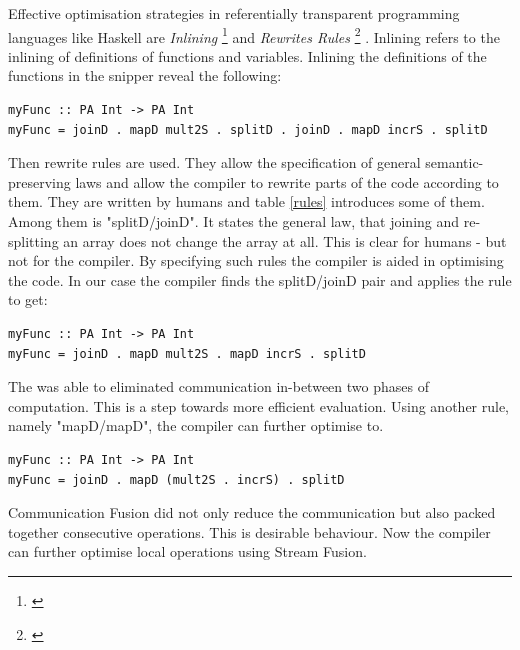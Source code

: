     Effective optimisation strategies in referentially transparent
    programming languages like Haskell are \emph{Inlining}
    \footnote{\cite{Inlining2002}}
    and \emph{Rewrites Rules}
    \footnote{\cite{Simon2001Rewrites}}
    .
    Inlining refers to the inlining of definitions
    of functions and variables. Inlining the definitions
    of the functions in the snipper reveal the following:
    \begin{lstlisting}
myFunc :: PA Int -> PA Int
myFunc = joinD . mapD mult2S . splitD . joinD . mapD incrS . splitD
    \end{lstlisting}
    Then rewrite rules are used. They allow the specification of general semantic-preserving
    laws and allow the compiler to rewrite parts of the code according to them.
    They are written by humans and table \ref{rules} introduces some of them.
    Among them is "splitD/joinD". It states the general law,
    that joining and re-splitting an array does not change the array at all.
    This is clear for humans - but not for the compiler. By specifying such rules
    the compiler is aided in optimising the code.
    In our case the compiler finds the splitD/joinD pair and applies the rule to get:
    \begin{lstlisting}
myFunc :: PA Int -> PA Int
myFunc = joinD . mapD mult2S . mapD incrS . splitD
    \end{lstlisting}
    The was able to eliminated communication in-between two phases of computation.
    This is a step towards more efficient evaluation.
    Using another rule, namely "mapD/mapD", the compiler can further optimise to.
    \begin{lstlisting}
myFunc :: PA Int -> PA Int
myFunc = joinD . mapD (mult2S . incrS) . splitD
    \end{lstlisting}
    Communication Fusion did not only reduce the communication but also
    packed together consecutive operations. This is desirable behaviour.
    Now the compiler can further optimise local operations using Stream Fusion.
    
